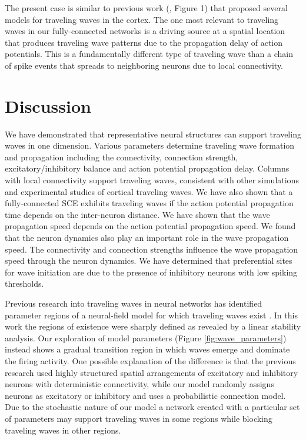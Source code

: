 \documentclass[12pt]{article}
\begin{document}
The present case is similar to previous work (\parencite{ermentrout2001}, Figure 1) that proposed several models for traveling waves in the cortex.
The one most relevant to traveling waves in our fully-connected networks is a driving source at a spatial location that produces traveling wave patterns due to the propagation delay of action potentials.
This is a fundamentally different type of traveling wave than a chain of spike events that spreads to neighboring neurons due to local connectivity.

\section{Discussion}
We have demonstrated that representative neural structures can support traveling waves in one dimension.
Various parameters determine traveling wave formation and propagation including the connectivity, connection strength, excitatory/inhibitory balance and action potential propagation delay.
Columns with local connectivity support traveling waves, consistent with other simulations and experimental studies of cortical traveling waves.
We have also shown that  a fully-connected SCE exhibits traveling waves if the action potential propagation time depends on the inter-neuron distance. 
We have shown that the wave propagation speed depends on the action potential propagation speed.
We found that the neuron dynamics also play an important role in the wave propagation speed.
The connectivity and connection strengths influence the wave propagation speed through the neuron dynamics.
We have determined that preferential sites for wave initiation are due to the presence of inhibitory neurons with low spiking thresholds.

Previous research into traveling waves in neural networks has identified parameter regions of a neural-field model for which traveling waves exist \parencite{Senk2020}.
In this work the regions of existence were sharply defined as revealed by a linear stability analysis.
Our exploration of model parameters (Figure \ref{fig:wave_parameters}) instead shows a gradual transition region in which waves emerge and dominate the firing activity.
One possible explanation of the difference is that the previous research used highly structured spatial arrangements of excitatory and inhibitory neurons with deterministic connectivity, while our model randomly assigns neurons as excitatory or inhibitory and uses a probabilistic connection model.
Due to the stochastic nature of our model a network created with a particular set of parameters may support traveling waves in some regions while blocking traveling waves in other regions.
\end{document}
